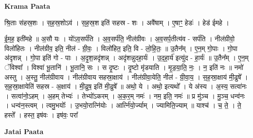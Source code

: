 \documentclass[17pt]{extarticle}
\begin{document}
\textbf{Krama Paata} \newline

श्रि॒ताः स॑हस्र॒शः । स॒ह॒स्र॒शोऽव॑ । स॒ह॒स्र॒श इति॑ सहस्र - 
शः । अवै॑षाम् । ए॒षाꣳ॒॒ हेडः॑ । हेड॑ ईमहे । 

ई॒म॒ह॒ इती॑महे ॥ अ॒सौ यः । यो॑ऽव॒सर्प॑ति । अ॒व॒सर्प॑ति॒ नील॑ग्रीवः । अ॒व॒सर्प॒तीत्य॑व - सर्प॑ति । नील॑ग्रीवो॒ विलो॑हितः । नील॑ग्रीव॒ इति॒ नील॑ - ग्री॒वः॒ । विलो॑हित॒ इति॒ वि - लो॒हि॒तः॒ ॥ उ॒तैन᳚म् । ए॒न॒म् गो॒पाः । गो॒पा अ॑दृशन्न् । गो॒पा इति॑ गो - पाः । अ॒दृ॒श॒न्नदृ॑शन्न् । अदृ॑शन्नुदहा॒र्यः॑ । उ॒द॒हा॒र्य॑ इत्यु॑द - हा॒र्यः॑ ॥ उ॒तैन᳚म् । ए॒न॒म् ॅविश्वा᳚ । विश्वा॑ भू॒तानि॑ । भू॒तानि॒ सः । स दृ॒ष्टः । दृ॒ष्टो मृ॑डयाति । मृ॒ड॒या॒ति॒ नः॒ । न॒ इति॑ नः ॥ नमो॑ अस्तु । अ॒स्तु॒ नील॑ग्रीवाय । नील॑ग्रीवाय सहस्रा॒क्षाय॑ । नील॑ग्रीवा॒येति॒ नील॑ - ग्री॒वा॒य॒ । स॒ह॒स्रा॒क्षाय॑ मी॒ढुषे᳚ । स॒ह॒स्रा॒क्षायेति॑ सहस्र - अ॒क्षाय॑ । मी॒ढुष॒ इति॑ मी॒ढुषे᳚ ॥ अथो॒ ये । अथो॒ इत्यथो᳚ । ये अ॑स्य । अ॒स्य॒ सत्वा॑नः । सत्वा॑नो॒ऽहम् । अ॒हम् तेभ्यः॑ । तेभ्यो॑ऽकरम् । अ॒क॒र॒म् नमः॑ । नम॒ इति॒ नमः॑ ॥ प्र मु॑ञ्च । मु॒ञ्च॒ धन्व॑नः । धन्व॑न॒स्त्वम् । त्वमु॒भयोः᳚ । उ॒भयो॒रात्नि॑योः । आर्त्नि॑यो॒र्ज्याम् । ज्यामिति॒ज्याम् ॥ याश्च॑ । च॒ ते॒ । ते॒ हस्ते᳚ । हस्त॒ इष॑वः । इष॑वः॒ परा᳚ \newline

\textbf{Jatai Paata} \newline
\end{document}
